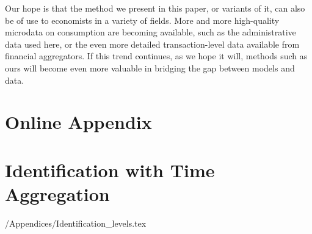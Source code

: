 \documentclass[titlepage]{\econtex}\newcommand{\texname}{ConsumptionHeterogeneity}
\renewcommand{\thetable}{\Roman{table}}
\renewcommand{\thefigure}{\Roman{figure}}
\begin{document}
	Our hope is that the method we present in this paper, or variants of it, can also be of use to economists in a variety of fields. More and more high-quality microdata on consumption are becoming available, such as the administrative data used here, or the even more detailed transaction-level data available from financial aggregators. If this trend continues, as we hope it will, methods such as ours will become even more valuable in bridging the gap between models and data.\\
	
	\small
	
	\normalsize
	
	\pagebreak
	\appendix
	\renewcommand\thefigure{\thesection.\arabic{figure}}  
	\renewcommand\thetable{\thesection.\arabic{table}}  
	
	
	\section*{Online Appendix}
	
	\section{Identification with Time Aggregation}\label{sec:Identification}
	
	\setcounter{figure}{0}   
	\setcounter{table}{0} 
	\econtexRoot/Appendices/Identification_levels.tex
	
\end{document}
